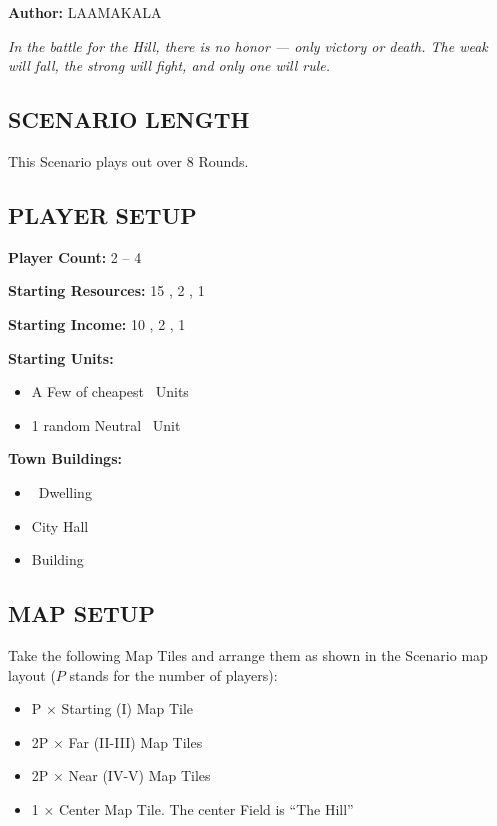 
\begin{multicols*}{2}

\textbf{Author:} LAAMAKALA

\textit{In the battle for the Hill, there is no honor — only victory or death. The weak will fall, the strong will fight, and only one will rule.}

\subsection*{\MakeUppercase{Scenario Length}}
This Scenario plays out over 8 Rounds.

\subsection*{\MakeUppercase{Player Setup}}
\textbf{Player Count:} 2 -- 4

\textbf{Starting Resources:} 15 , 2 , 1 

\textbf{Starting Income:} 10 , 2 , 1 

\textbf{Starting Units:}
\begin{itemize}
  \item A Few of cheapest \silver\ Units
  \item 1 random Neutral \bronze\ Unit
\end{itemize}

\textbf{Town Buildings:}
\begin{itemize}
  \item \bronze\ Dwelling
  \item City Hall
  \item {} Building
\end{itemize}

\subsection*{\MakeUppercase{Map Setup}}
Take the following Map Tiles and arrange them as shown in the Scenario map layout ($P$ stands for the number of players):

\begin{itemize}
  \item P × Starting (I) Map Tile
  \item 2P × Far (II-III) Map Tiles
  \item 2P × Near (IV-V) Map Tiles
  \item 1 × Center Map Tile. The center Field is ``The Hill''
\end{itemize}


\end{multicols*}
